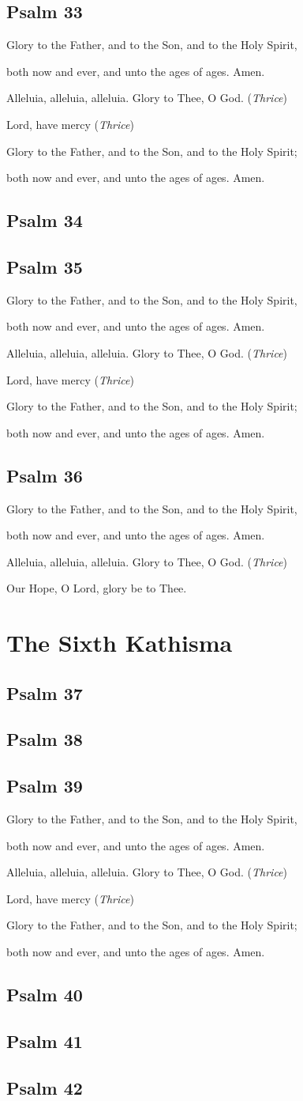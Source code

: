 \documentclass[12pt,openany]{book}
\newcommand{\kathismabreak}{
  \medskip
  \begin{center}
  \begin{footnotesize}
  Glory to the Father, and to the Son, and to the Holy Spirit,
  
  both now and ever, and unto the ages of ages. Amen.

  Alleluia, alleluia, alleluia. Glory to Thee, O God. (\textit{Thrice})

  Lord, have mercy (\textit{Thrice})

  Glory to the Father, and to the Son, and to the Holy Spirit;
  
  both now and ever, and unto the ages of ages. Amen.
  \end{footnotesize}
  \end{center}
  \smallbreak
}
\newcommand{\kathismaend}{
  \medskip
  \begin{center}
  \begin{footnotesize}
  Glory to the Father, and to the Son, and to the Holy Spirit,
  
  both now and ever, and unto the ages of ages. Amen.

  Alleluia, alleluia, alleluia. Glory to Thee, O God. (\textit{Thrice})

  Our Hope, O Lord, glory be to Thee.
  \end{footnotesize}
  \end{center}
  \smallbreak
}
\begin{document}
\section{Psalm 33}


\kathismabreak
\smallskip

\section{Psalm 34}

\smallskip
\section{Psalm 35}


\pagebreak %
\kathismabreak
\smallskip

\section{Psalm 36}


\kathismaend

\chapter*{The Sixth Kathisma}
\smallskip
\section{Psalm 37}

\smallskip
\section{Psalm 38}

\smallskip
\section{Psalm 39}


\kathismabreak
\section{Psalm 40}

\smallskip
\section{Psalm 41}

\smallskip
\section{Psalm 42}

\end{document}
